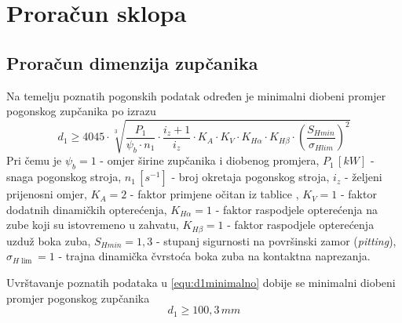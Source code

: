 \documentclass[11pt,a4paper]{report}
\begin{document}
\chapter{Proračun sklopa}
\section{Proračun dimenzija zupčanika}
Na temelju poznatih pogonskih podatak određen je minimalni diobeni promjer pogonskog zupčanika po izrazu
\begin{equation}
d_1\geq 4045 \cdot \sqrt[3]{\frac{P_1}{\psi_b \cdot n_1} \cdot \frac{i_z +1}{i_z}\cdot K_A \cdot 
K_V \cdot K_{H\alpha} \cdot K_{H\beta} \cdot \left(\frac{S_{Hmin}}{\sigma_{Hlim}}\right)^2 }\label{equ:d1minimalno}
\end{equation}
Pri čemu je $\psi_b=1$ - omjer širine zupčanika i diobenog promjera,
$P_1 \, [kW]$ - snaga pogonskog stroja,
$n_1 \, [s^{-1}]$ - broj okretaja pogonskog stroja,
$i_z$ - željeni prijenosni omjer,
$K_A=2$ - faktor primjene očitan iz tablice \cite{potrebniMaterijali},
$K_V=1$ - faktor dodatnih dinamičkih opterećenja,
$K_{H\alpha}=1$ - faktor raspodjele opterećenja na zube koji su istovremeno u zahvatu,
$K_{H\beta}=1$ - faktor raspodjele opterećenja uzduž boka zuba,
$S_{Hmin}=1,3$ - stupanj sigurnosti na površinski zamor (\textit{pitting}),
$\sigma_{H\lim}=1$ - trajna dinamička čvrstoća boka zuba na kontaktna naprezanja.

Uvrštavanje poznatih podataka u \eqref{equ:d1minimalno} dobije se minimalni diobeni promjer pogonskog zupčanika $$d_1\geq 100,3\,mm$$
\end{document}
